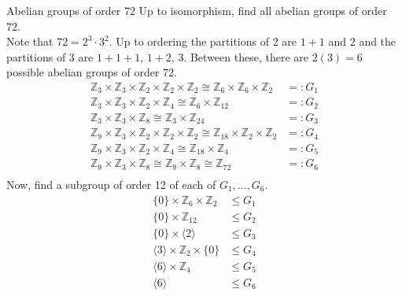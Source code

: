 \documentclass[12pt]{article}
\newcommand{\Z}{\mathbb{Z}}
\begin{document}
	\begin{myex}{Abelian groups of order 72}{}
		Up to isomorphism, find all abelian groups of order 72.\\
		
		Note that $72=2^3\cdot3^2$. Up to ordering the partitions of $2$ are $1+1$ and $2$ and the partitions of $3$ are $1+1+1$, $1+2$, $3$. Between these, there are $2(3)=6$ possible abelian groups of order 72.
		\begin{align*}
			\Z_3\times\Z_3\times\Z_2\times\Z_2\times\Z_2\cong\Z_6\times\Z_6\times\Z_2&=:G_1\\
			\Z_3\times\Z_3\times\Z_2\times\Z_4\cong\Z_6\times\Z_{12}&=:G_2\\
			\Z_3\times\Z_3\times\Z_8\cong\Z_3\times\Z_{24}&=:G_3\\
			\Z_9\times\Z_3\times\Z_2\times\Z_2\times\Z_2\cong\Z_{18}\times\Z_2\times\Z_2&=:G_4\\
			\Z_9\times\Z_3\times\Z_2\times\Z_4\cong\Z_{18}\times\Z_{4}&=:G_5\\
			\Z_9\times\Z_3\times\Z_8\cong\Z_9\times\Z_8\cong\Z_{72}&=:G_6\\
		\end{align*}
		Now, find a subgroup of order 12 of each of $G_1, \dots, G_6$.
		\begin{align*}
			\{0\}\times\Z_6\times\Z_2&\leq G_1\\
			\{0\}\times\Z_{12}&\leq G_2\\
			\{0\}\times\langle 2\rangle&\leq G_3\\
			\langle 3\rangle\times\Z_2\times\{0\}&\leq G_4\\
			\langle 6\rangle\times\Z_4&\leq G_5\\
			\langle 6\rangle&\leq G_6
		\end{align*}
	\end{myex}
\end{document}
